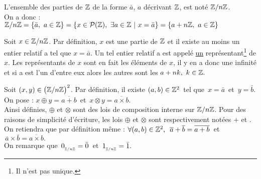 \vspace{1.5cm}

L'ensemble des parties de \(\mathbb{Z}\) de la forme \(\bar{a}\), \(a\) décrivant \(\mathbb{Z}\), est noté \(\mathbb{Z}/n\mathbb{Z}\).\vspace{0.1cm}\\
On a donc : \(\ZZ/n\ZZ=\{\bar{a},\ a\in \ZZ\}=\{x\in \mathcal{P}(\ZZ),\ \exists a\in \ZZ \ \rvert \ x=\bar{a}\}=\{a+n\ZZ,\ a\in \ZZ\}\)

\vspace{1.5cm}

\begin{small}
    Soit \(x\in \mathbb{Z}/n\mathbb{Z}\). Par définition, \(x\) est une partie de \(\mathbb{Z}\) et il existe au moins un entier relatif a tel que \(x=\bar{a}\). Un tel entier relatif a est appelé \underline{un} représentant\footnote{Il n'est pas unique.} de \(x\). Les représentants de \(x\) sont en fait les éléments de \(x\), il y en a donc une infinité et si a est l'un d'entre eux alors les autres sont les \(a+nk,\ k\in\mathbb{Z}.\)
\end{small}

\vspace{1.7cm}

Soit \((x,y)\in \bigl(\mathbb{Z}/n\mathbb{Z}\bigr)^2\). Par définition, il existe \((a,b)\in \mathbb{Z}^2\, \) tel que \(\,x=\bar{a}\, \) et \(\, y=\bar{b}\).\vspace{0.2cm}\\
On pose : \(x\oplus y=\overline{a+b}\,\) et \(\,x\otimes y=\overline{a\times b}\). 
\vspace*{0.1cm}\\
Ainsi définies, \(\oplus\) et \(\otimes\) sont des lois de composition interne sur \(\mathbb{Z}/n\mathbb{Z}\). Pour des raisons de simplicité d'écriture, les lois \(\oplus\) et \(\otimes\) sont respectivement notées $+$ et \x.\vspace{0.2cm}\\
On retiendra que par définition même : \(\forall (a,b)\in \mathbb{Z}^2,\ \, \overline{a}+\overline{b}=\overline{a+b}\,\) et \(\,\overline{a}\times \overline{b}=\overline{a\times b}.\)\vspace{0.2cm}\\
On remarque que \(\, 0_{_{\mathbb{Z}/n\mathbb{Z}}}=\bar{0}\,\) et \(\, 1_{_{\mathbb{Z}/n\mathbb{Z}}}=\bar{1}.\)

\newpage
